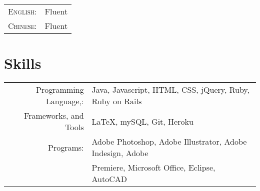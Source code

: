 \documentclass[a4paper,10pt]{article} %
\begin{document}
\begin{tabular}{rl}
\textsc{English:} & Fluent\\

\textsc{Chinese:} & Fluent\\
\end{tabular}


\section{Skills}

\begin{tabular}{rl}
Programming Language,: & Java, Javascript, HTML, CSS, jQuery, Ruby, Ruby on Rails\\
Frameworks, and Tools & LaTeX, mySQL, Git, Heroku \\
Programs: & Adobe Photoshop, Adobe Illustrator, Adobe Indesign, Adobe \\
& Premiere, Microsoft Office, Eclipse, AutoCAD
\end{tabular}

\end{document}
